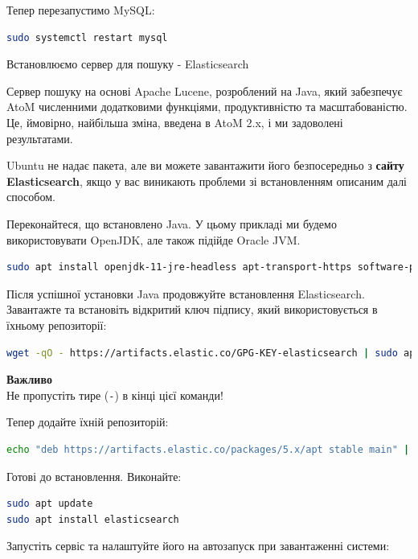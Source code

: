 \documentclass[14pt,a4paper]{article}
\begin{document}
\begin{large}
Тепер перезапустимо MySQL:

\begin{lstlisting}[language=bash]
sudo systemctl restart mysql
\end{lstlisting}

Встановлюємо сервер для пошуку - Elasticsearch

Сервер пошуку на основі Apache Lucene, розроблений на Java, який забезпечує AtoM численними додатковими функціями, продуктивністю та масштабованістю. Це, ймовірно, найбільша зміна, введена в AtoM 2.x, і ми задоволені результатами.

Ubuntu не надає пакета, але ви можете завантажити його безпосередньо з \textbf{сайту Elasticsearch}, якщо у вас виникають проблеми зі встановленням описаним далі способом.

Переконайтеся, що встановлено Java. У цьому прикладі ми будемо використовувати OpenJDK, але також підійде Oracle JVM.

\begin{lstlisting}[language=bash]
sudo apt install openjdk-11-jre-headless apt-transport-https software-properties-common
\end{lstlisting}

Після успішної установки Java продовжуйте встановлення Elasticsearch. Завантажте та встановіть відкритий ключ підпису, який використовується в їхньому репозиторії:

\begin{lstlisting}[language=bash]
wget -qO - https://artifacts.elastic.co/GPG-KEY-elasticsearch | sudo apt-key add -
\end{lstlisting}

\textbf{Важливо} \\
Не пропустіть тире (\texttt{-}) в кінці цієї команди!

Тепер додайте їхній репозиторій:

\begin{lstlisting}[language=bash]
echo "deb https://artifacts.elastic.co/packages/5.x/apt stable main" | sudo tee -a /etc/apt/sources.list.d/elastic-5.x.list
\end{lstlisting}

Готові до встановлення. Виконайте:

\begin{lstlisting}[language=bash]
sudo apt update
sudo apt install elasticsearch
\end{lstlisting}

Запустіть сервіс та налаштуйте його на автозапуск при завантаженні системи:


\end{large}
\end{document}
